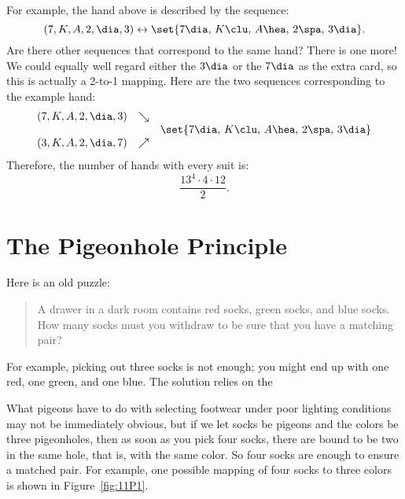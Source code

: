 For example, the hand above is described by the sequence:
%
\[
(7, K, A, 2, \dia, 3) \leftrightarrow 
    \set{ 7 \dia, \, K \clu, \, A \hea, \, 2 \spa, \, 3 \dia  }.
\]
%
Are there other sequences that correspond to the same hand?  There is
one more!  We could equally well regard either the $3 \dia$ or the $7
\dia$ as the extra card, so this is actually a 2-to-1 mapping.  Here
are the two sequences corresponding to the example hand:
%
\[
\begin{array}{rcl}
(7, K, A, 2, \dia, 3) & \searrow & \\
 && \set{ 7 \dia, \, K \clu, \, A \hea, \, 2 \spa, \, 3 \dia } \\
(3, K, A, 2, \dia, 7) & \nearrow &
\end{array}
\]
%
Therefore, the number of hands with every suit is:
%
\[
\frac{13^4 \cdot 4 \cdot 12}{2}.
\]

\begin{problems}
\practiceproblems
{}

\classproblems

\examproblems
{}

\end{problems}


\section{The Pigeonhole Principle}\label{pigeon_hole_sec}

Here is an old puzzle:

\begin{quotation}
\noindent A drawer in a dark room contains red socks, green socks, and
blue socks.  How many socks must you withdraw to be sure that you have
a matching pair?
\end{quotation}

For example, picking out three socks is not enough; you might end up
with one red, one green, and one blue.  The solution relies on the


What pigeons have to do with selecting footwear under poor lighting
conditions may not be immediately obvious, but if we let socks be
pigeons and the colors be three pigeonholes, then as soon as you pick
four socks, there are bound to be two in the same hole, that is, with
the same color.  So four socks are enough to ensure a matched
pair.  For example, one possible mapping of four socks to three colors
is shown in Figure~\ref{fig:11P1}.

